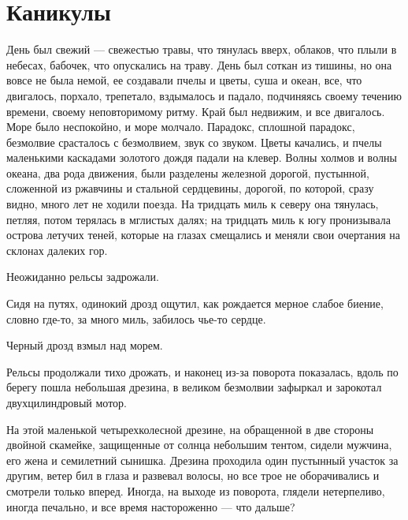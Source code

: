  
 
 
 
 

\section{Каникулы}

День был свежий — свежестью травы, что тянулась вверх, облаков, что плыли в
небесах, бабочек, что опускались на траву. День был соткан из тишины, но она
вовсе не была немой, ее создавали пчелы и цветы, суша и океан, все, что
двигалось, порхало, трепетало, вздымалось и падало, подчиняясь своему течению
времени, своему неповторимому ритму. Край был недвижим, и все двигалось. Море
было неспокойно, и море молчало. Парадокс, сплошной парадокс, безмолвие
срасталось с безмолвием, звук со звуком. Цветы качались, и пчелы маленькими
каскадами золотого дождя падали на клевер. Волны холмов и волны океана, два
рода движения, были разделены железной дорогой, пустынной, сложенной из
ржавчины и стальной сердцевины, дорогой, по которой, сразу видно, много лет не
ходили поезда. На тридцать миль к северу она тянулась, петляя, потом терялась в
мглистых далях; на тридцать миль к югу пронизывала острова летучих теней,
которые на глазах смещались и меняли свои очертания на склонах далеких гор.

Неожиданно рельсы задрожали.

Сидя на путях, одинокий дрозд ощутил, как рождается мерное слабое биение,
словно где-то, за много миль, забилось чье-то сердце.

Черный дрозд взмыл над морем.

Рельсы продолжали тихо дрожать, и наконец из-за поворота показалась, вдоль по
берегу пошла небольшая дрезина, в великом безмолвии зафыркал и зарокотал
двухцилиндровый мотор.

На этой маленькой четырехколесной дрезине, на обращенной в две стороны двойной
скамейке, защищенные от солнца небольшим тентом, сидели мужчина, его жена и
семилетний сынишка. Дрезина проходила один пустынный участок за другим, ветер
бил в глаза и развевал волосы, но все трое не оборачивались и смотрели только
вперед. Иногда, на выходе из поворота, глядели нетерпеливо, иногда печально, и
все время настороженно — что дальше?

